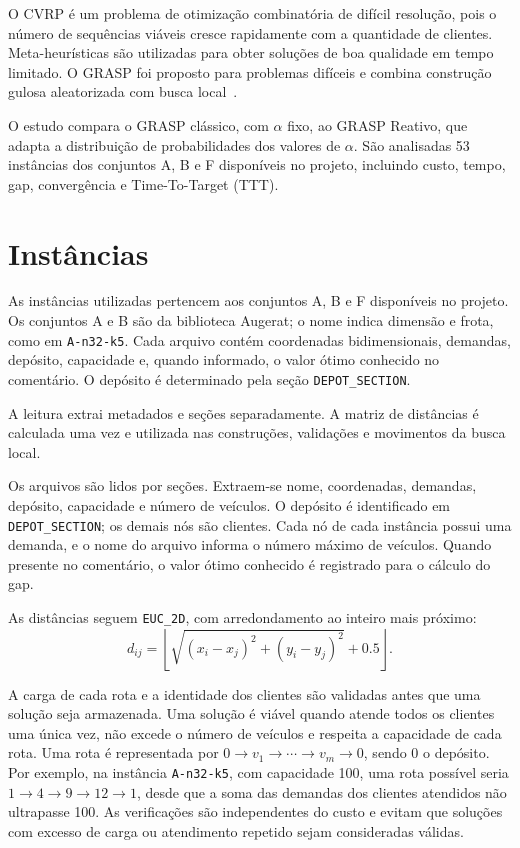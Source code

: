 \documentclass[12pt]{article}
\begin{document}
O CVRP é um problema de otimização combinatória de difícil resolução, pois o número de sequências viáveis cresce rapidamente com a quantidade de clientes. Meta-heurísticas são utilizadas para obter soluções de boa qualidade em tempo limitado. O GRASP foi proposto para problemas difíceis e combina construção gulosa aleatorizada com busca local \,\cite{feo1989,resende2019}.

O estudo compara o GRASP clássico, com $\alpha$ fixo, ao GRASP Reativo, que adapta a distribuição de probabilidades dos valores de $\alpha$. São analisadas 53 instâncias dos conjuntos A, B e F disponíveis no projeto, incluindo custo, tempo, gap, convergência e Time-To-Target (TTT).

\section{Instâncias}

As instâncias utilizadas pertencem aos conjuntos A, B e F disponíveis no projeto. Os conjuntos A e B são da biblioteca Augerat; o nome indica dimensão e frota, como em \texttt{A-n32-k5}. Cada arquivo contém coordenadas bidimensionais, demandas, depósito, capacidade e, quando informado, o valor ótimo conhecido no comentário. O depósito é determinado pela seção \texttt{DEPOT\_SECTION}.

A leitura extrai metadados e seções separadamente. A matriz de distâncias é calculada uma vez e utilizada nas construções, validações e movimentos da busca local.

Os arquivos são lidos por seções. Extraem-se nome, coordenadas, demandas, depósito, capacidade e número de veículos. O depósito é identificado em \texttt{DEPOT\_SECTION}; os demais nós são clientes. Cada nó de cada instância possui uma demanda, e o nome do arquivo informa o número máximo de veículos. Quando presente no comentário, o valor ótimo conhecido é registrado para o cálculo do gap.

As distâncias seguem \texttt{EUC\_2D}, com arredondamento ao inteiro mais próximo:
\begin{equation}
d_{ij}=\left\lfloor\sqrt{(x_i-x_j)^2+(y_i-y_j)^2}+0.5\right\rfloor.
\end{equation}

A carga de cada rota e a identidade dos clientes são validadas antes que uma solução seja armazenada. Uma solução é viável quando atende todos os clientes uma única vez, não excede o número de veículos e respeita a capacidade de cada rota. Uma rota é representada por $0 \rightarrow v_1 \rightarrow \cdots \rightarrow v_m \rightarrow 0$, sendo $0$ o depósito. Por exemplo, na instância \texttt{A-n32-k5}, com capacidade 100, uma rota possível seria $1 \rightarrow 4 \rightarrow 9 \rightarrow 12 \rightarrow 1$, desde que a soma das demandas dos clientes atendidos não ultrapasse 100. As verificações são independentes do custo e evitam que soluções com excesso de carga ou atendimento repetido sejam consideradas válidas.
\end{document}
